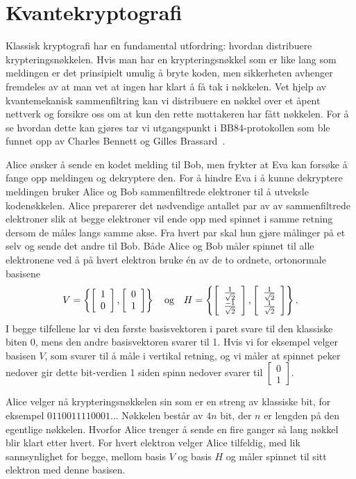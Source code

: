 \chapter{Kvantekryptografi}

Klassisk kryptografi har en fundamental utfordring: hvordan distribuere krypteringsnøkkelen. Hvis man har en krypteringsnøkkel som er like lang som meldingen er det prinsipielt umulig å bryte koden, men sikkerheten avhenger fremdeles av at man vet at ingen har klart å få tak i nøkkelen. Vet hjelp av kvantemekanisk sammenfiltring kan vi distribuere en nøkkel over et åpent nettverk og forsikre oss om at kun den rette mottakeren har fått nøkkelen. For å se hvordan dette kan gjøres tar vi utgangspunkt i BB84-protokollen som ble funnet opp av Charles Bennett og Gilles Brassard~\cite{bb84}.

Alice ønsker å sende en kodet melding til Bob, men frykter at Eva kan forsøke å fange opp meldingen og dekryptere den. For å hindre Eva i å kunne dekryptere meldingen bruker Alice og Bob sammenfiltrede elektroner til å utveksle kodenøkkelen. Alice preparerer det nødvendige antallet par av av sammenfiltrede elektroner slik at begge elektroner vil ende opp med spinnet i samme retning dersom de måles langs samme akse. Fra hvert par skal hun gjøre målinger på et selv og sende det andre til Bob. Både Alice og Bob måler spinnet til alle elektronene ved å på hvert elektron bruke \'en av de to ordnete, ortonormale basisene
\begin{displaymath}
	V = \left\{ \left[\begin{array}{c}1\\0\end{array}\right], \left[\begin{array}{c}0\\1\end{array}\right] \right\} 
	\quad \text{og} \quad 
	H = \left\{ \left[\begin{array}{c}\frac{1}{\sqrt{2}}\\ \frac{-1}{\sqrt{2}}\end{array}\right], \left[\begin{array}{c}\frac{1}{\sqrt{2}}\\ \frac{1}{\sqrt{2}}\end{array}\right] \right\}.
\end{displaymath}
I begge tilfellene lar vi den første basisvektoren i paret svare til den klassiske biten 0, mens den andre basisvektoren svarer til 1. Hvis vi for eksempel velger basisen $V$, som svarer til å måle i vertikal retning, og vi måler at spinnet peker nedover gir dette bit-verdien 1 siden spinn nedover svarer til $\left[\begin{array}{c}0\\1\end{array}\right]$. 

Alice velger nå krypteringsnøkkelen sin som er en streng av klassiske bit, for eksempel $0110011110001\ldots$ Nøkkelen består av $4n$ bit, der $n$ er lengden på den egentlige nøkkelen. Hvorfor Alice trenger å sende en fire ganger så lang nøkkel blir klart etter hvert. For hvert elektron velger Alice tilfeldig, med lik sannsynlighet for begge, mellom basis $V$ og basis $H$ og måler spinnet til sitt elektron med denne basisen. 